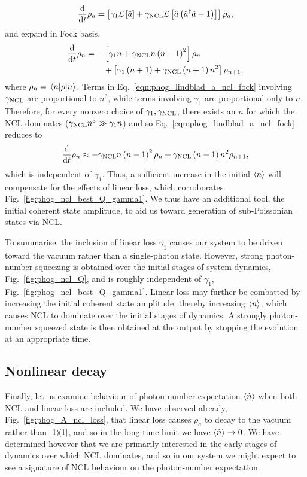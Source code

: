 \begin{equation}\label{eqn:phog_lindblad_a_ncl_2}
\frac{\mathrm{d}}{\mathrm{d}t} \rho_a = \left[ \gamma_1 \mathcal{L}\left[\hat{a}\right] + \gamma_{\text{NCL}} \mathcal{L}\left[\hat{a}\left(\hat{a}^\dagger \hat{a} - 1\right)\right]\right] \rho_a,
\end{equation}
and expand in Fock basis,
\begin{align}\label{eqn:phog_lindblad_a_ncl_fock}
\ddt \rho_{n} = - &\left[ \gamma_1 n + \gncl n \left(n - 1\right)^2 \right] \rho_n \notag \\
%
&+\left[ \gamma_1 \left(n+1\right) + \gncl \left(n+1\right) n^2 \right] \rho_{n+1},
\end{align}
where $\rho_n = \ev{\rho}{n}$. Terms in Eq.~\ref{eqn:phog_lindblad_a_ncl_fock} involving $\gamma_{\text{NCL}}$ are proportional to $n^3$, while terms involving $\gamma_1$ are proportional only to $n$. Therefore, for every nonzero choice of $\gamma_1, \gamma_{\text{NCL}}$, there exists an $n$ for which the NCL dominates ($\gamma_{\text{NCL}} n^3 \gg \gamma_1 n$) and so Eq.~\ref{eqn:phog_lindblad_a_ncl_fock} reduces to
\begin{equation}
\frac{\mathrm{d}}{\mathrm{d}t} \rho_n \approx - \gamma_{\text{NCL}} n \left(n-1\right)^2 \rho_n + \gamma_{\text{NCL}} \left(n+1\right)n^2 \rho_{n+1},
\end{equation}
which is independent of $\gamma_1$. Thus, a sufficient increase in the initial $\ev{n}$ will compensate for the effects of linear loss, which corroborates Fig.~\ref{fig:phog_ncl_best_Q_gamma1}. We thus have an additional tool, the initial coherent state amplitude, to aid us toward generation of sub-Poissonian states via NCL.

To summarise, the inclusion of linear loss $\gamma_1$ causes our system to be driven toward the vacuum rather than a single-photon state. However, strong photon-number squeezing is obtained over the initial stages of system dynamics, Fig.~\ref{fig:phog_ncl_Q}, and is roughly independent of $\gamma_1$, Fig.~\ref{fig:phog_ncl_best_Q_gamma1}. Linear loss may further be combatted \cite{Mikhalychev2011, Mogilevtsev2013} by increasing the initial coherent state amplitude, thereby increasing $\ev{n}$, which causes NCL to dominate over the initial stages of dynamics. A strongly photon-number squeezed state is then obtained at the output by stopping the evolution at an appropriate time.


\subsection{Nonlinear decay}

Finally, let us examine behaviour of photon-number expectation $\ev{\hat{n}}$ when both NCL and linear loss are included. We have observed already, Fig.~\ref{fig:phog_A_ncl_loss}, that linear loss causes $\rho_a$ to decay to the vacuum rather than $\dyad{1}$, and so in the long-time limit we have $\ev{\hat{n}} \rightarrow 0$. We have determined however that we are primarily interested in the early stages of dynamics over which NCL dominates, and so in our system we might expect to see a signature of NCL behaviour on the photon-number expectation.


